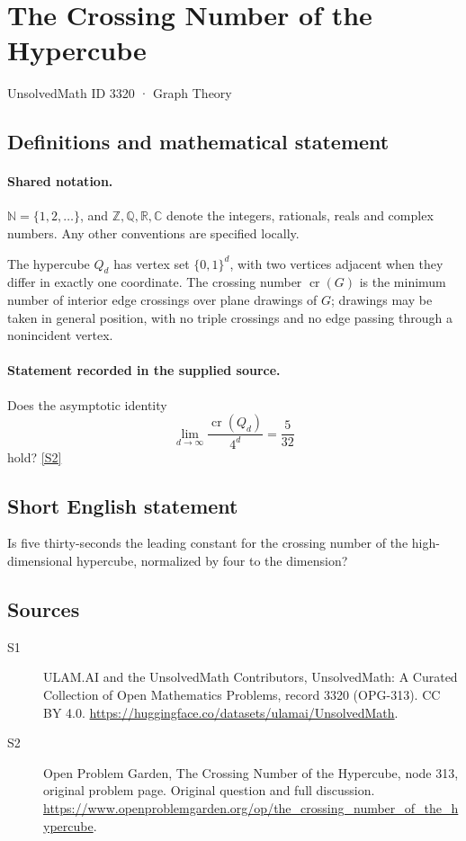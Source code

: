 \documentclass[11pt]{article}
\newcommand{\sref}[2]{\hyperlink{source:#1:#2}{[S#2]}}
\begin{document}
\setcounter{section}{3319}
\section{The Crossing Number of the Hypercube}\label{3320}
{\small\sffamily UnsolvedMath ID 3320 · Graph Theory}
\subsection{Definitions and mathematical statement}

\paragraph{Shared notation.}$\mathbb N=\{1,2,\ldots\}$, and $\mathbb Z,\mathbb Q,\mathbb R,\mathbb C$ denote the integers, rationals, reals and complex numbers. Any other conventions are specified locally.


The hypercube $Q_d$ has vertex set $\{0,1\}^d$, with two vertices adjacent when they differ in exactly one coordinate. The crossing number $\operatorname{cr}(G)$ is the minimum number of interior edge crossings over plane drawings of $G$; drawings may be taken in general position, with no triple crossings and no edge passing through a nonincident vertex.
\paragraph{Statement recorded in the supplied source.}
Does the asymptotic identity\[ \lim_{d\to\infty}\frac{\operatorname{cr}(Q_d)}{4^d}=\frac5{32} \] hold? \sref{3320}{2}
\subsection{Short English statement}
Is five thirty-seconds the leading constant for the crossing number of the high-dimensional hypercube, normalized by four to the dimension?
\subsection{Sources}
\begin{description}
\item[\hypertarget{source:3320:1}{S1}] ULAM.AI and the UnsolvedMath Contributors, UnsolvedMath: A Curated Collection of Open Mathematics Problems, record 3320 (OPG-313). CC BY 4.0. \url{https://huggingface.co/datasets/ulamai/UnsolvedMath}.
\item[\hypertarget{source:3320:2}{S2}] Open Problem Garden, The Crossing Number of the Hypercube, node 313, original problem page. Original question and full discussion. \url{https://www.openproblemgarden.org/op/the_crossing_number_of_the_hypercube}.

\end{description}
\label{end:3320}
\end{document}
